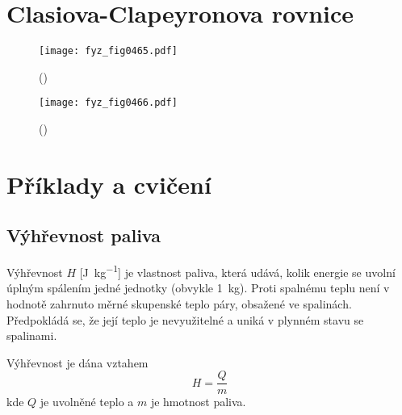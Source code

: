   
  \section{Clasiova-Clapeyronova rovnice}\label{fyz:IchapXLVsecIII}
  
    \begin{figure}[ht!] %
      \centering
      \texttt{[image: fyz\_fig0465.pdf]}
      \caption{ 
              (\cite[s.~707]{Feynman01})}
      \label{fyz:fig0465}
    \end{figure}

    \begin{figure}[ht!] %
      \centering
      \texttt{[image: fyz\_fig0466.pdf]}
      \caption{ 
              (\cite[s.~707]{Feynman01})}
      \label{fyz:fig0466}
    \end{figure}
  \section{Příklady a cvičení}\label{fyz:IchapXLVsecIV}
    \subsection{Výhřevnost paliva}\label{fyz:IchapXLVsecIVssecI}
      Výhřevnost \(H\) [\si{\joule\per\kg}] je vlastnost paliva, která udává, kolik energie se
      uvolní úplným spálením jedné jednotky (obvykle \SI{1}{\kg}). Proti spalnému teplu není v
      hodnotě zahrnuto měrné skupenské teplo páry, obsažené ve spalinách. Předpokládá se, že její
      teplo je nevyužitelné a uniká v plynném stavu se spalinami.

      Výhřevnost je dána vztahem
      \begin{equation*}
        H=\dfrac{Q}{m}
      \end{equation*}
      kde \(Q\) je uvolněné teplo a \(m\) je hmotnost paliva. 

      
      
      
      
    

